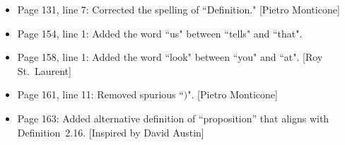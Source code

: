 \documentclass[11pt]{article}%
\begin{document}
\begin{itemize}
\item Page 131, line 7: Corrected the spelling of ``Definition." [Pietro Monticone]
\item Page 154, line 1: Added the word ``us" between ``tells" and ``that".
\item Page 158, line 1: Added the word ``look" between ``you" and ``at". [Roy St.~Laurent]
\item Page 161, line 11: Removed spurious ``$)$". [Pietro Monticone]
\item Page 163: Added alternative definition of ``proposition'' that aligns with Definition~2.16. [Inspired by David Austin]
\end{itemize}
\end{document}
